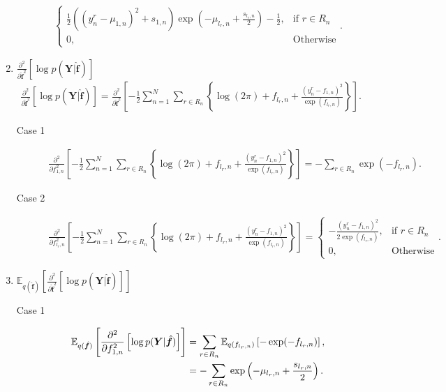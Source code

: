 \documentclass[9pt]{article}
\providecommand{\ve}[1]{{\bm{#1}}}%
\providecommand{\mat}[1]{{\bm{#1}}} %
\providecommand{\ve}[1]{{\mathbf{#1}}}
\providecommand{\mat}[1]{{\mathbf{#1}}}
\newcommand{\fracpartial}[2]{\frac{\partial #1}{\partial  #2}} %
\begin{document}
\begin{enumerate}
\begin{description}
\begin{align}
\begin{cases}
		\frac{1}{2}\left(\left(y_n^r - \mu_{1,n}\right)^2 + s_{1,n}\right)\exp\left(-\mu_{l_r,n} + \frac{s_{l_r,n}}{2} \right)-\frac{1}{2}, & \mbox{if $r\in R_n$}\\
		0, & \mbox{Otherwise}
		\end{cases}.
		\end{align}
	\end{description}
	\item $\fracpartial{^2}{\hat{\ve{f}}^2}\left[\log p(\mat{Y}|\hat{\ve{f}})\right]$
		\begin{align}
	\fracpartial{^2}{\hat{\ve{f}}^2}\left[\log p(\mat{Y}|\hat{\ve{f}})\right] = \fracpartial{^2}{\hat{\ve{f}}^2}\left[-\frac{1}{2}\sum_{n=1}^{N}\sum_{r\in R_n} \left\{\log(2\pi) + f_{l_r,n} + \frac{(y_n^r - f_{1,n})^2}{\exp(f_{l_r,n})}  \right\}\right].
	\end{align}
	\begin{description}
		\item[Case 1]
		\begin{align}
		\fracpartial{^2}{f_{1,n}^2}\left[-\frac{1}{2}\sum_{n=1}^{N}\sum_{r\in R_n} \left\{\log(2\pi) + f_{l_r,n} + \frac{(y_n^r - f_{1,n})^2}{\exp(f_{l_r,n})}  \right\}\right] = -\sum_{r\in R_n}\exp(-f_{l_r,n}).
		\end{align}
		\item[Case 2]
		\begin{align}
		\fracpartial{^2}{f_{l_r,n}^2}\left[-\frac{1}{2}\sum_{n=1}^{N}\sum_{r\in R_n} \left\{\log(2\pi) + f_{l_r,n} + \frac{(y_n^r - f_{1,n})^2}{\exp(f_{l_r,n})}  \right\}\right] = \begin{cases}
		-\frac{(y_n^r - f_{1,n})^2}{2\exp(f_{l_r,n})}, & \mbox{if $r\in R_n$}\\
		0, & \mbox{Otherwise}
		\end{cases}.
		\end{align}
	\end{description}
\item $\mathbb{E}_{q(\hat{\ve{f}})}\left[\fracpartial{^2}{\hat{\ve{f}}^2}\left[\log p(\mat{Y}|\hat{\ve{f}})\right]\right]$
\begin{description}
	\item[Case 1] 
	\begin{align}
	\notag \mathbb{E}_{q(\hat{\ve{f}})}\left[\fracpartial{^2}{f_{1,n}^2}\left[\log p(\mat{Y}|\hat{\ve{f}})\right]\right] &= \sum_{r\in R_n}\mathbb{E}_{q(f_{l_r,n})}\left[-\exp(-f_{l_r,n})\right],\\
	&= -\sum_{r\in R_n} \exp\left(-\mu_{l_r,n} + \frac{s_{l_r,n}}{2} \right).
	\end{align}

\end{description}
\end{enumerate}
\end{document}
